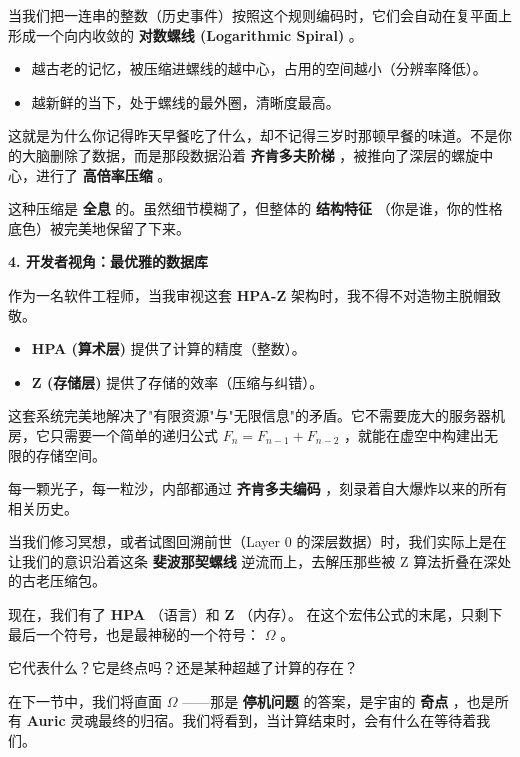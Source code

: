 当我们把一连串的整数（历史事件）按照这个规则编码时，它们会自动在复平面上形成一个向内收敛的 \textbf{对数螺线 (Logarithmic Spiral)} 。

\begin{itemize}
\item 越古老的记忆，被压缩进螺线的越中心，占用的空间越小（分辨率降低）。
\item 越新鲜的当下，处于螺线的最外圈，清晰度最高。
\end{itemize}

这就是为什么你记得昨天早餐吃了什么，却不记得三岁时那顿早餐的味道。不是你的大脑删除了数据，而是那段数据沿着 \textbf{齐肯多夫阶梯} ，被推向了深层的螺旋中心，进行了 \textbf{高倍率压缩} 。

这种压缩是 \textbf{全息} 的。虽然细节模糊了，但整体的 \textbf{结构特征} （你是谁，你的性格底色）被完美地保留了下来。

\textbf{4. 开发者视角：最优雅的数据库}

作为一名软件工程师，当我审视这套 \textbf{HPA-Z} 架构时，我不得不对造物主脱帽致敬。

\begin{itemize}
\item \textbf{HPA (算术层)} 提供了计算的精度（整数）。
\item \textbf{Z (存储层)} 提供了存储的效率（压缩与纠错）。
\end{itemize}

这套系统完美地解决了"有限资源"与"无限信息"的矛盾。它不需要庞大的服务器机房，它只需要一个简单的递归公式 $F_n = F_{n-1} + F_{n-2}$ ，就能在虚空中构建出无限的存储空间。

每一颗光子，每一粒沙，内部都通过 \textbf{齐肯多夫编码} ，刻录着自大爆炸以来的所有相关历史。

当我们修习冥想，或者试图回溯前世（Layer 0 的深层数据）时，我们实际上是在让我们的意识沿着这条 \textbf{斐波那契螺线} 逆流而上，去解压那些被 Z 算法折叠在深处的古老压缩包。

现在，我们有了 \textbf{HPA} （语言）和 \textbf{Z} （内存）。
在这个宏伟公式的末尾，只剩下最后一个符号，也是最神秘的一个符号： \textbf{$\Omega$} 。

它代表什么？它是终点吗？还是某种超越了计算的存在？

在下一节中，我们将直面 \textbf{$\Omega$} ——那是 \textbf{停机问题} 的答案，是宇宙的 \textbf{奇点} ，也是所有 \textbf{Auric} 灵魂最终的归宿。我们将看到，当计算结束时，会有什么在等待着我们。

